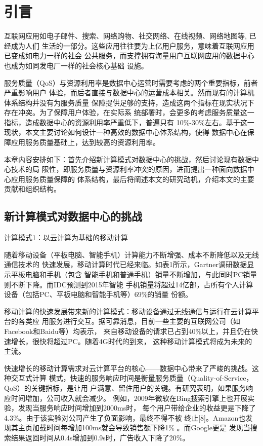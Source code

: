 

\chapter{引言}
\label{chap:intro}

互联网应用如电子邮件、搜索、网络购物、社交网络、在线视频、网络地图等, 已经成为人们
生活的一部分。这些应用往往要为上亿用户服务，意味着互联网应用已变成如电力一样的社会
公共服务，而支撑拥有海量用户互联网应用的数据中心也成为如同发电厂一样的社会核心基础
设施。

服务质量（QoS）与资源利用率是数据中心运营时需要考虑的两个重要指标，前者严重影响用户
体验，而后者直接与数据中心的运营成本相关。然而现有的计算机体系结构并没有为服务质量
保障提供足够的支持，造成这两个指标在现实状况下存在冲突。为了保障用户体验，在实际系
统部署时，会更多的考虑服务质量这一指标，造成数据中心的资源利用率严重低下，普遍只有
10\%-30\%左右。基于这一现状，本文主要讨论如何设计一种高效的数据中心体系结构，使得
数据中心在保障应用服务质量基础上，达到较高的资源利用率。

本章内容安排如下：首先介绍新计算模式对数据中心的挑战，然后讨论现有数据中心技术的局
限性，即服务质量与资源利率冲突的原因，进而提出一种面向数据中心应用服务质量保障的
体系结构，最后将阐述本文的研究动机，介绍本文的主要贡献和组织结构。


\section{新计算模式对数据中心的挑战}

计算模式1：以云计算为基础的移动计算

随着移动设备（平板电脑、智能手机）计算能力不断增强、成本不断降低以及无线通信技术的
快速发展，移动计算时代已经来临。如表1所示，Gartner调研数据显示平板电脑和手机（包含
智能手机和普通手机）销量不断增加，与此同时PC销量则不断下降。而IDC预测到2015年智能
手机销量将超过14亿部，占所有个人计算设备（包括PC、平板电脑和智能手机等）69\%的销量
份额。

移动计算的快速发展带来新的计算模式：移动设备通过无线通信与运行在云计算平台的各类应
用服务进行交互。据可靠消息，目前一些主要的互联网公司（如Facebook和Baidu等）均表示，
来自移动设备的请求已占到40\%以上，并且仍在快速增长，很快将超过PC。随着4G时代的到来，
这种移动计算模式将成为未来的主流。

快速增长的移动计算需求对云计算平台的核心——数据中心带来了严峻的挑战。这种交互式计算
模式，快速的服务响应时间是衡量服务质量（Quality-of-Service，QoS）的关键指标，是让用
户满意、留住用户的关键。有研究表明，如果服务响应时间增加，公司收入就会减少。
例如，2009年微软在Bing搜索引擎上也开展实验，发现当服务响应时间增加到2000ms时，
每个用户带给企业的收益更是下降了4.3\%。由于该实验对公司产生了负面影响，最终不得不被
终止[8]。Amazon也发现其主页加载时间每增加100ms就会导致销售额下降1\% 。而Google更是
发现当搜索结果返回时间从0.4s增加到0.9s时，广告收入下降了20\%。

